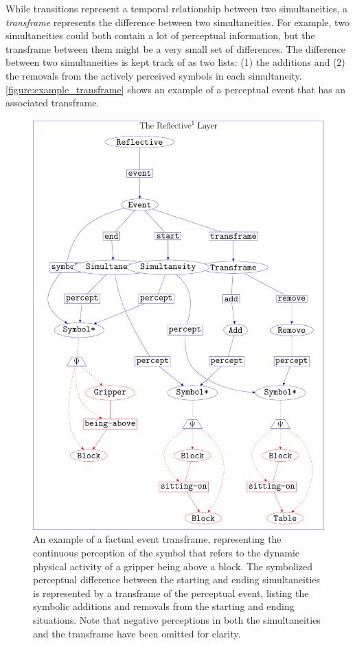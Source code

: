 While transitions represent a temporal relationship between two
simultaneities, a \emph{transframe} represents the difference between
two simultaneities.  For example, two simultaneities could both
contain a lot of perceptual information, but the transframe between
them might be a very small set of differences.  The difference between
two simultaneities is kept track of as two lists: (1) the additions
and (2) the removals from the actively perceived symbols in each
simultaneity.  {\mbox{\autoref{figure:example_transframe}}} shows an
example of a perceptual event that has an associated transframe.
\begin{figure}
\center
\includegraphics[width=12cm]{gfx/example_transframe}
\caption[An example of a factual event transframe.]{An example of a
  factual event transframe, representing the continuous perception of
  the symbol that refers to the dynamic physical activity of a gripper
  being above a block.  The symbolized perceptual difference between
  the starting and ending simultaneities is represented by a
  transframe of the perceptual event, listing the symbolic additions
  and removals from the starting and ending situations.  Note that
  negative perceptions in both the simultaneities and the transframe
  have been omitted for clarity.}
\label{figure:example_transframe}
\end{figure}

